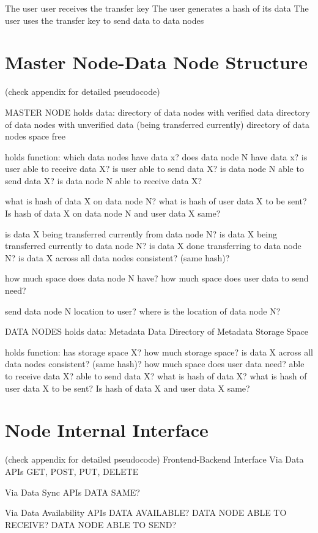 \documentclass[acmsmall]{acmart}
\begin{document}
The user user receives the transfer key 
The user generates a hash of its data
The user uses the transfer key to send data to data nodes

\section{Master Node-Data Node Structure}
(check appendix for detailed pseudocode)


MASTER NODE
holds data:
directory of data nodes with verified data
directory of data nodes with unverified data (being transferred currently)
directory of data nodes space free

holds function:
which data nodes have data x?
does data node N have data x?
is user able to receive data X?
is user able to send data X?
is data node N able to send data X?
is data node N able to receive data X?


what is hash of data X on data node N?
what is hash of user data X to be sent?
Is hash of data X on data node N and user data X same?


is data X being transferred currently from data node N?
is data X being transferred currently to data node N?
is data X done transferring to data node N?
is data X across all data nodes consistent? (same hash)?

how much space does data node N have?
how much space does user data to send need?

send data node N location to user?
where is the location of data node N?


DATA NODES
holds data:
Metadata
Data
Directory of Metadata
Storage Space


holds function:
has storage space X?
how much storage space?
is data X across all data nodes consistent? (same hash)?
how much space does user data need?
able to receive data X?
able to send data X?
what is hash of data X?
what is hash of user data X to be sent?
Is hash of data X and user data X same?

\section{Node Internal Interface}
(check appendix for detailed pseudocode)
Frontend-Backend Interface
Via Data APIs
GET, POST, PUT, DELETE

Via Data Sync APIs
DATA SAME? 

Via Data Availability APIs
DATA AVAILABLE?
DATA NODE ABLE TO RECEIVE?
DATA NODE ABLE TO SEND?
\end{document}
